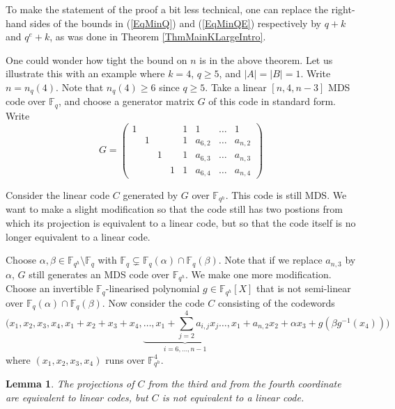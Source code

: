 \documentclass[a4paper]{article}
\newtheorem{lm}[thm]{Lemma}
\theoremstyle{definition}
\newcommand{\FF}{\mathbb F}
\begin{document}
To make the statement of the proof a bit less technical, one can replace the right-hand sides of the bounds in (\ref{EqMinQ}) and (\ref{EqMinQE}) respectively by $q+k$ and $q^e+k$, as was done in Theorem \ref{ThmMainKLargeIntro}.

One could wonder how tight the bound on $n$ is in the above theorem.
Let us illustrate this with an example where $k=4$, $q \geq 5$, and \( |A| = |B| = 1\).
Write $n = n_q(4)$.
Note that $n_q(4) \geq 6$ since $q \geq 5$.
Take a linear $[n,4,n-3]$ MDS code over $\FF_q$, and choose a generator matrix $G$ of this code in standard form.
Write
\[
 G = \begin{pmatrix}
 1 & & & & 1 & 1 & \dots & 1 \\
 & 1 & & & 1 & a_{6,2} & \dots & a_{n,2} \\
 & & 1 & & 1 & a_{6,3} & \dots & a_{n,3} \\
 & & & 1 & 1 & a_{6,4} & \dots & a_{n,4}
\end{pmatrix}
\]

Consider the linear code $C$ generated by $G$ over $\FF_{q^h}$.
This code is still MDS.
We want to make a slight modification so that the code still has two postions from which its projection is equivalent to a linear code, but so that the code itself is no longer equivalent to a linear code.

Choose $\alpha, \beta \in \FF_{q^h}\setminus\FF_q$ with \( \FF_q \varsubsetneq \FF_q(\alpha) \cap \FF_q(\beta) \).
Note that if we replace $a_{n,3}$ by $\alpha$, $G$ still generates an MDS code over $\FF_{q^h}$.
We make one more modification.
Choose an invertible $\FF_q$-linearised polynomial $g \in \FF_{q^h}[X]$ that is not semi-linear over \( \FF_q(\alpha) \cap \FF_q(\beta) \).
Now consider the code $C$ consisting of the codewords
\[
 \Big( x_1,x_2,x_3,x_4,x_1+x_2+x_3+x_4, \underbrace{\dots, x_1 + \sum_{j=2}^4 a_{i,j} x_j \dots}_{i=6,\dots,n-1}, x_1 + a_{n,2} x_2 + \alpha x_3 +  g(\beta g^{-1}(x_4)) \Big)
\]
where $(x_1,x_2,x_3,x_4)$ runs over $\FF_{q^h}^4$.

\begin{lm}
\emph{The projections of $C$ from the third and from the fourth coordinate are equivalent to linear codes, but $C$ is not equivalent to a linear code.}
\end{lm}
\end{document}
